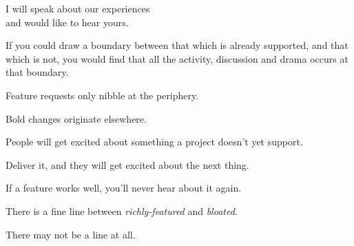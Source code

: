 \documentclass[t,handout,aspectratio=169]{beamer}
\begin{document}
\begin{frame}[standout]
    I will speak about our experiences \\
    and would like to hear yours.
\end{frame}

\begin{frame}[fragile] %
    \vfill
       
\end{frame}

\begin{frame}[fragile] %
    \vfill
     
\end{frame}

\begin{frame}[fragile] %
    \vfill
    If you could draw a boundary between that which is already supported, and that which is not, \pause you would find that all the activity, discussion and drama occurs at that boundary. \pause

    Feature requests only nibble at the periphery. \pause

    Bold changes originate elsewhere.
\end{frame}

\begin{frame}[fragile]%
    \vfill
    People will get excited about something a project doesn't yet support. \pause

    Deliver it, and they will get excited about the next thing.
\end{frame}

\begin{frame}[fragile]%
    \vfill
    If a feature works well, you'll never hear about it again.
\end{frame}

\begin{frame}[fragile]%
    \vfill
    There is a fine line between \textit{richly-featured} and \textit{bloated}. \pause

    There may not be a line at all.
\end{frame}
\end{document}
